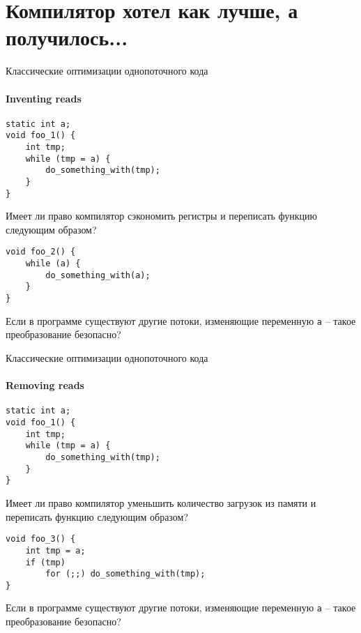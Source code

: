 
\section{Компилятор хотел как лучше, а получилось...}
\showTOC

\begin{frame}[fragile]{Классические оптимизации однопоточного кода}
\framesubtitle{Inventing reads}

\begin{lstlisting}
static int a;
void foo_1() {
    int tmp;
    while (tmp = a) {
        do_something_with(tmp);
    }
}
\end{lstlisting}

\pause

Имеет ли право компилятор сэкономить регистры и переписать функцию следующим образом?

\begin{lstlisting}
void foo_2() {
    while (a) {
        do_something_with(a);
    }
}
\end{lstlisting}

\pause

Если в программе существуют другие потоки, изменяющие переменную \texttt{a} -- такое преобразование безопасно?
\end{frame}


\begin{frame}[fragile]{Классические оптимизации однопоточного кода}
\framesubtitle{Removing reads}

\begin{lstlisting}
static int a;
void foo_1() {
    int tmp;
    while (tmp = a) {
        do_something_with(tmp);
    }
}
\end{lstlisting}

\pause

Имеет ли право компилятор уменьшить количество загрузок из памяти и переписать функцию следующим образом?

\begin{lstlisting}
void foo_3() {
    int tmp = a;
    if (tmp)
        for (;;) do_something_with(tmp);
}
\end{lstlisting}

\pause

Если в программе существуют другие потоки, изменяющие переменную \texttt{a} -- такое преобразование безопасно?
\end{frame}


